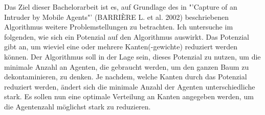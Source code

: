 Das Ziel dieser Bachelorarbeit ist es, auf Grundlage des in "'Capture of an Intruder by Mobile Agents"' (BARRIÈRE L. et al. 2002) beschriebenen Algorithmus weitere Problemstellungen zu betrachten. Ich untersuche im folgenden, wie sich ein Potenzial auf den Algorithmus auswirkt. Das Potenzial gibt an, um wieviel eine oder mehrere Kanten(-gewichte) reduziert werden können. Der Algorithmus soll in der Lage sein, dieses Potenzial zu nutzen, um die minimale Anzahl an Agenten, die gebraucht werden, um den ganzen Baum zu dekontaminieren, zu denken. Je nachdem, welche Kanten durch das Potenzial reduziert werden, ändert sich die minimale Anzahl der Agenten unterschiedliche stark. Es sollen nun eine optimale Verteilung an Kanten angegeben werden, um die Agentenzahl möglichst stark zu reduzieren.\\


